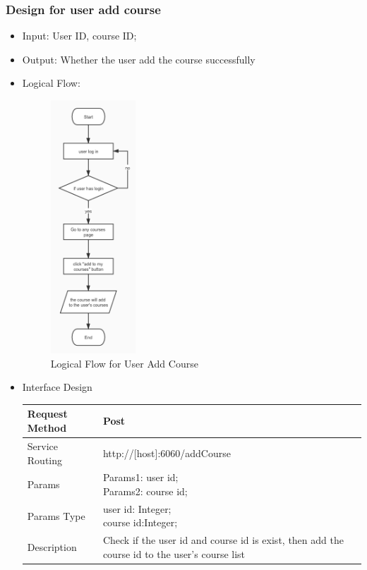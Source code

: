 \documentclass[16pt]{scrreprt}
\begin{document}
\subsubsection{Design for user add course}
\begin{itemize}
	\item Input: User ID, course ID; 
	\item Output: Whether the user add the course successfully
	\item Logical Flow:
	 \begin{figure}[H]
	\centering
	\includegraphics[width=0.3\textwidth]{diagrams/user-add-course.jpg}
	\caption{Logical Flow for User Add Course}
\end{figure}
	\item Interface Design
	\begin{center}
    \begin{tabular}{p{5cm}p{10cm}}
        \hline
	    Request Method & Post\\
        \hline
	    Service Routing &  http://[host]:6060/addCourse\\
        \hline
	    Params & \makecell[l]{Params1: user id;\\ Params2: course id;}\\ 
        \hline
        Params Type & \makecell[l]{user id: Integer;\\course id:Integer;}\\
        \hline
        Description & Check if the user id and course id is exist, then add the course id to the user's course list\\

\end{tabular}
\end{center}
\end{itemize}
\end{document}
